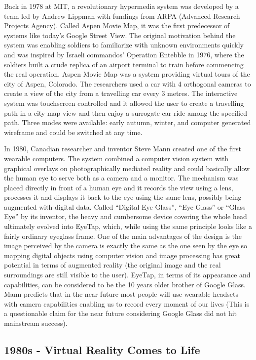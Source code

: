 \documentclass[12pt, a4paper]{article}
\begin{document}
Back in 1978 at MIT, a revolutionary hypermedia system was developed by a team led by Andrew Lippman with fundings from ARPA (Advanced Research Projects Agency). Called Aspen Movie Map, it was the first predecessor of systems like today’s Google Street View. The original motivation behind the system was enabling soldiers to familiarize with unknown environments quickly and was inspired by Israeli commandos’ Operation Entebble in 1976, where the soldiers built a crude replica of an airport terminal to train before commencing the real operation. Aspen Movie Map was a system providing virtual tours of the city of Aspen, Colorado. The researchers used a car with 4 orthogonal cameras to create a view of the city from a travelling car every 3 metres. The interactive system was touchscreen controlled and it allowed the user to create a travelling path in a city-map view and then enjoy a surrogate car ride among the specified path. Three modes were available: early autumn, winter, and computer generated wireframe and could be switched at any time.

In 1980, Canadian researcher and inventor Steve Mann created one of the first wearable computers. The system combined a computer vision system with graphical overlays on photographically mediated reality and could basically allow the human eye to serve both as a camera and a monitor. The mechanism was placed directly in front of a human eye and it records the view using a lens, processes it and displays it back to the eye using the same lens, possibly being augmented with digital data. Called “Digital Eye Glass”, “Eye Glass” or “Glass Eye” by its inventor, the heavy and cumbersome device covering the whole head ultimately evolved into EyeTap, which, while using the same principle looks like a fairly ordinary eyeglass frame. One of the main advantages of the design is the image perceived by the camera is exactly the same as the one seen by the eye so mapping digital objects using computer vision and image processing has great potential in terms of augmented reality (the original image and the real surroundings are still visible to the user). EyeTap, in terms of its appearance and capabilities, can be considered to be the 10 years older brother of Google Glass. Mann predicts that in the near future most people will use wearable headsets with camera capabilities enabling us to record every moment of our lives (This is a questionable claim for the near future considering Google Glass did not hit mainstream success).

\subsection{1980s - Virtual Reality Comes to Life}
\end{document}
